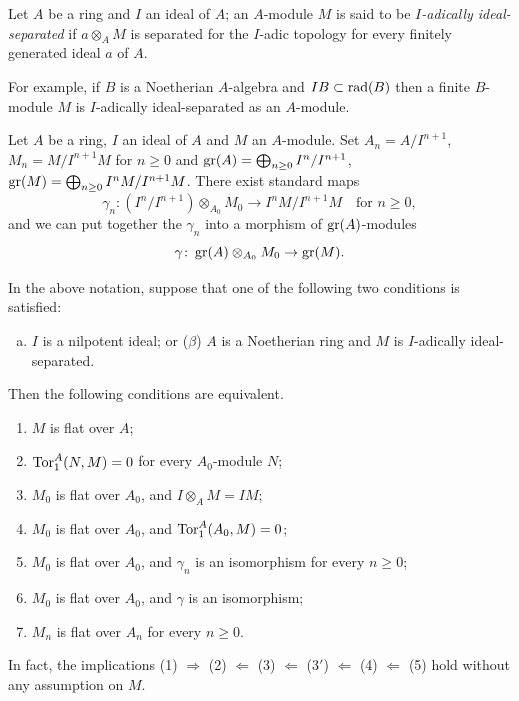 \begin{definition*}
Let $A$ be a ring and $I$ an ideal of $A$; an $A$-module $M$ is said to be
\emph{$I$-adically ideal-separated} if $a \otimes_A M$ is separated for the $I$-adic
topology for every finitely generated ideal $a$ of $A$.

For example, if $B$ is a Noetherian $A$-algebra and $IB \subset \operatorname{rad}(B)$ then a
finite $B$-module $M$ is $I$-adically ideal-separated as an $A$-module.
\end{definition*}

Let $A$ be a ring, $I$ an ideal of $A$ and $M$ an $A$-module. Set $A_n = A/I^{n+1}$,
$M_n = M/I^{n+1}M$ for $n \ge 0$ and $\operatorname{gr}(A) = \bigoplus_{n \ge 0} I^n/I^{n+1}$,
$\operatorname{gr}(M) = \bigoplus_{n \ge 0} I^nM/I^{n+1}M$. There exist standard maps
\[
  \gamma_n\colon (I^n/I^{n+1}) \otimes_{A_0} M_0 \to I^nM/I^{n+1}M \quad \text{for } n \ge 0,
\]
and we can put together the $\gamma_n$ into a morphism of $\operatorname{gr}(A)$-modules
\[
  \gamma\colon \operatorname{gr}(A) \otimes_{A_0} M_0 \to \operatorname{gr}(M).
\]

\begin{theorem}\label{thm:22.3}
In the above notation, suppose that one of the following two conditions is
satisfied:
\begin{enumerate}[(a)]
  \item $I$ is a nilpotent ideal;
or ($\beta$) $A$ is a Noetherian ring and $M$ is $I$-adically ideal-separated.
\end{enumerate}
Then the following conditions are equivalent.
\begin{enumerate}[(1)]
  \item $M$ is flat over $A$;
  \item $\operatorname{Tor}^A_1(N, M) = 0$ for every $A_0$-module $N$;
  \item $M_0$ is flat over $A_0$, and $I \otimes_A M = IM$;
  \item[$3'$] $M_0$ is flat over $A_0$, and $\operatorname{Tor}^A_1(A_0, M) = 0$;
  \item $M_0$ is flat over $A_0$, and $\gamma_n$ is an isomorphism for every $n \ge 0$;
  \item[$4'$] $M_0$ is flat over $A_0$, and $\gamma$ is an isomorphism;
  \item $M_n$ is flat over $A_n$ for every $n \ge 0$.
\end{enumerate}
In fact, the implications (1) $\Rightarrow$ (2) $\Leftarrow$ (3) $\Leftarrow$ (3$'$) $\Leftarrow$ (4) $\Leftarrow$ (5)
hold without any assumption on $M$.
\end{theorem}

